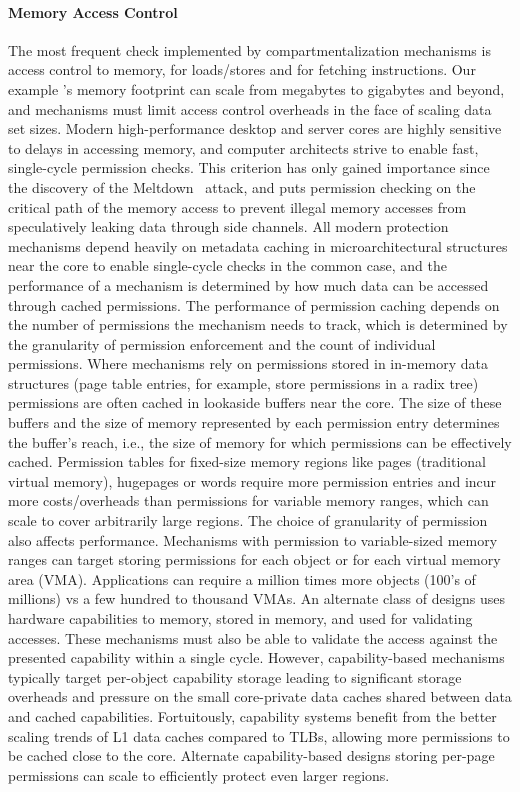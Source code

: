 \paragraph{Memory Access Control}
The most frequent check implemented by compartmentalization mechanisms is
access control to memory, for loads/stores and for fetching instructions.
Our example \browser{}'s memory footprint can scale from megabytes to 
gigabytes and beyond, and mechanisms must limit access control overheads
in the face of scaling data set sizes.
Modern high-performance desktop and server cores are highly sensitive to
delays in accessing memory, and computer architects strive to enable
fast, single-cycle permission checks.
This criterion has only gained importance since the discovery of the 
Meltdown~\cite{lipp18sec} attack, and 
puts permission checking on the critical path of the memory access to prevent
illegal memory accesses from speculatively leaking data through side channels.
All modern protection mechanisms depend heavily on metadata caching in
microarchitectural structures near the core to enable single-cycle checks in
the common case, and the performance of a mechanism is determined by how 
much data can be accessed through cached permissions.
The performance of permission caching depends on the number of permissions
the mechanism needs to track, which is determined by the granularity of
permission enforcement and the count of individual permissions.
Where mechanisms rely on permissions stored in in-memory data structures
(page table entries, for example, store permissions in a radix tree)
permissions are often cached in lookaside buffers near the core.
The size of these buffers and the size of memory represented by each 
permission entry determines the buffer's reach, i.e., the size of memory
for which permissions can be effectively cached.
Permission tables for fixed-size memory regions like pages 
(traditional virtual memory), hugepages or words require more permission entries 
and incur more costs/overheads than permissions for variable memory ranges,
which can scale to cover arbitrarily large regions.
The choice of granularity of permission also affects performance.
Mechanisms with permission to variable-sized memory ranges can target
storing permissions for each object or for each virtual memory area (VMA).
Applications can require a million times more objects (100's of millions)
vs a few hundred to thousand VMAs.
An alternate class of designs uses hardware capabilities to memory, stored
in memory, and used for validating accesses.
These mechanisms must also be able to validate the access against the
presented capability within a single cycle.
However, capability-based mechanisms typically target per-object capability
storage leading to significant storage overheads and pressure on the
small core-private data caches shared between data and cached capabilities.
Fortuitously, capability systems benefit from the better scaling trends of
L1 data caches compared to TLBs, allowing more permissions to be cached
close to the core.
Alternate capability-based designs storing per-page permissions can scale to
efficiently protect even larger regions.

